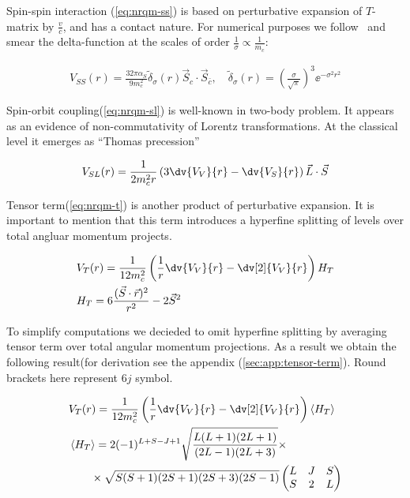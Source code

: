 Spin-spin interaction (\cref{eq:nrqm-ss}) is based on perturbative expansion of $T$-matrix by $\frac{v}{c}$, and has a contact nature. For numerical purposes we follow~\cite{gbs-model} and smear the delta-function at the scales of order $\frac{1}{\sigma} \propto \frac{1}{m_c}$:

\begin{align} \label{eq:nrqm-ss}
    V_{SS}(r) = \frac{32 \pi \alpha_S}{9 m_c^2} \tilde{\delta}_\sigma(r) \vec{S}_c \cdot \vec{S}_{\bar{c}},\quad \tilde{\delta}_\sigma(r) = \left(\frac{\sigma}{\sqrt{\pi}}\right)^3 \ee^{-\sigma^2 r^2}
\end{align}

Spin-orbit coupling(\cref{eq:nrqm-sl}) is well-known in two-body problem. It appears as an evidence of non-commutativity of Lorentz transformations. At the classical level it emerges as ``Thomas precession''~\cite{thomas}

\begin{align} \label{eq:nrqm-sl}
    V_{SL}(r) = \frac{1}{2 m_c^2 r} \left( 3 \dv{V_V}{r} - \dv{V_S}{r} \right) \vec{L} \cdot \vec{S}
\end{align}

Tensor term(\cref{eq:nrqm-t}) is another product of perturbative expansion. It is important to mention that this term introduces a hyperfine splitting of levels over total angluar momentum projects.

\begin{align} \label{eq:nrqm-t}
    &V_T(r) = \frac{1}{12 m_c^2} \left( \frac{1}{r} \dv{V_V}{r} - \dv[2]{V_V}{r} \right) H_T \\
    &H_T = 6\frac{(\vec{S} \cdot \vec{r})^2}{r^2} - 2\vec{S}^2
\end{align}

To simplify computations we decieded to omit hyperfine splitting by averaging tensor term over total angular momentum projections. As a result we obtain the following result(for derivation see the appendix (\cref{sec:app:tensor-term}). Round brackets here represent $6j$ symbol.

\begin{align}
    &V_T(r) = \frac{1}{12 m_c^2} \left( \frac{1}{r} \dv{V_V}{r} - \dv[2]{V_V}{r} \right) \left<H_T\right> \\
    &\left<H_T\right> = 2 (-1)^{L+S-J+1} \sqrt{\frac{L(L+1)(2L+1)}{(2L-1)(2L+3)}} \times \nonumber \\
    &\qquad \times \sqrt{S(S+1)(2S+1)(2S+3)(2S-1)} \left( \begin{matrix}
                                                L & J & S \\
                                                S & 2 & L
                                              \end{matrix} \right)
\end{align}

